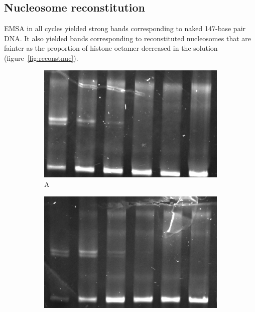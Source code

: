 \documentclass[parskip=full, numbers=noenddot]{scrreprt}
\begin{document}
\subsection{Nucleosome reconstitution}
\label{ssec:reconstnuc}

EMSA in all cycles yielded strong bands corresponding to naked 147-base pair DNA. It also yielded bands corresponding to reconstituted nucleosomes that are fainter as the proportion of histone octamer decreased in the solution (figure~\ref{fig:reconstnuc}).

\begin{figure}[htpb]
  \centering
  \begin{subfigure}[htpb]{0.4\textwidth}
    \centering
    \includegraphics[width=\textwidth]{reconstnuc_a}
    \caption{A}
    \label{fig:reconstnuc_a}
  \end{subfigure}
  \begin{subfigure}[htpb]{0.4\textwidth}
    \centering
    \includegraphics[width=\textwidth]{reconstnuc_b}

\end{subfigure}
\end{figure}
\end{document}

